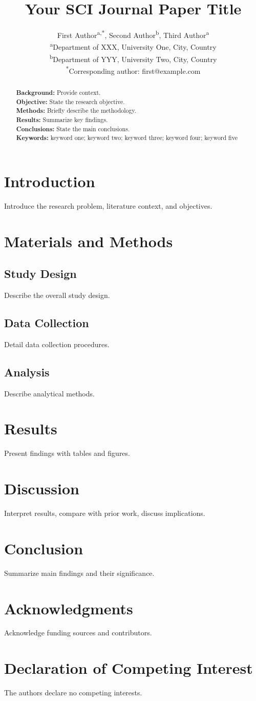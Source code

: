 \documentclass[12pt,a4paper]{article}
\title{Your SCI Journal Paper Title}
\author{
  First Author\textsuperscript{a,*},
  Second Author\textsuperscript{b},
  Third Author\textsuperscript{a} \\[12pt]
  \textsuperscript{a}Department of XXX, University One, City, Country \\
  \textsuperscript{b}Department of YYY, University Two, City, Country \\[6pt]
  \textsuperscript{*}Corresponding author: first@example.com
}
\date{}
\begin{document}
\maketitle

\begin{abstract}
\noindent
\textbf{Background:} Provide context. \\
\textbf{Objective:} State the research objective. \\
\textbf{Methods:} Briefly describe the methodology. \\
\textbf{Results:} Summarize key findings. \\
\textbf{Conclusions:} State the main conclusions. \\[6pt]
\textbf{Keywords:} keyword one; keyword two; keyword three; keyword four; keyword five
\end{abstract}

\section{Introduction}
Introduce the research problem, literature context, and objectives.

\section{Materials and Methods}
\subsection{Study Design}
Describe the overall study design.

\subsection{Data Collection}
Detail data collection procedures.

\subsection{Analysis}
Describe analytical methods.

\section{Results}
Present findings with tables and figures.

\section{Discussion}
Interpret results, compare with prior work, discuss implications.

\section{Conclusion}
Summarize main findings and their significance.

\section*{Acknowledgments}
Acknowledge funding sources and contributors.

\section*{Declaration of Competing Interest}
The authors declare no competing interests.



\end{document}

